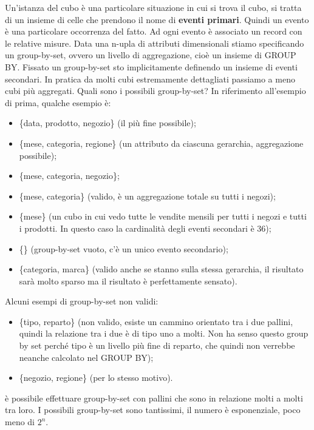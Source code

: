 Un'istanza del cubo è una particolare situazione in cui si trova il cubo, si tratta di un insieme di celle che prendono il nome di \textbf{eventi primari}. Quindi un evento è una particolare occorrenza del fatto. Ad ogni evento è associato un record con le relative misure.\newline
Data una n-upla di attributi dimensionali stiamo specificando un group-by-set, ovvero un livello di aggregazione, cioè un insieme di GROUP BY. Fissato un group-by-set sto implicitamente definendo un insieme di eventi secondari. In pratica da molti cubi estremamente dettagliati passiamo a meno cubi più aggregati.\newline
Quali sono i possibili group-by-set? In riferimento all'esempio di prima, qualche esempio è:
\begin{itemize}
	\item \{data, prodotto, negozio\} (il più fine possibile);
	\item \{mese, categoria, regione\} (un attributo da ciascuna gerarchia, aggregazione possibile);
	\item \{mese, categoria, negozio\};
	\item \{mese, categoria\} (valido, è un aggregazione totale su tutti i negozi);
	\item \{mese\} (un cubo in cui vedo tutte le vendite mensili per tutti i negozi e tutti i prodotti. In questo caso la cardinalità degli eventi secondari è 36);
	\item \{\} (group-by-set vuoto, c'è un unico evento secondario);
	\item \{categoria, marca\} (valido anche se stanno sulla stessa gerarchia, il risultato sarà molto sparso ma il risultato è perfettamente sensato).
\end{itemize}
Alcuni esempi di group-by-set non validi:
\begin{itemize}
	\item \{tipo, reparto\} (non valido, esiste un cammino orientato tra i due pallini, quindi la relazione tra i due è di tipo uno a molti. Non ha senso questo group by set perché tipo è un livello più fine di reparto, che quindi non verrebbe neanche calcolato nel GROUP BY);
	\item \{negozio, regione\} (per lo stesso motivo).
\end{itemize}
\begin{info}[Morale:]
	è possibile effettuare group-by-set con pallini che sono in relazione molti a molti tra loro.\newline
	I possibili group-by-set sono tantissimi, il numero è esponenziale, poco meno di $2^n$.
\end{info}

